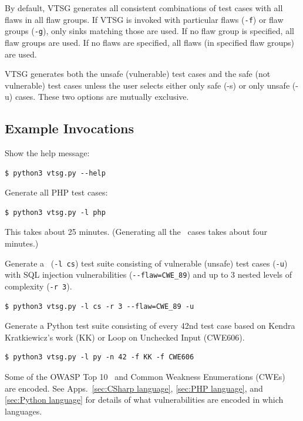 
By default, VTSG generates all consistent combinations of test cases with all flaws in
all flaw groups.  If VTSG is invoked with particular flaws (\verb|-f|) or flaw groups
(\verb|-g|), only sinks matching those are used.
If no flaw group is specified, all flaw groups are used.
If no flaws are specified, all flaws (in specified flaw groups) are used.

VTSG generates both the unsafe (vulnerable)
test cases and the safe (not vulnerable) test cases unless the user selects
either only safe (-s) or only unsafe (-u) cases.  These two options are
mutually exclusive.

\subsection{Example Invocations}

Show the help message:
\begin{verbatim}
$ python3 vtsg.py --help
\end{verbatim}

Generate all PHP test cases:
\begin{verbatim}
$ python3 vtsg.py -l php
\end{verbatim}

This takes about 25 minutes.  (Generating all the \CSharp\ cases takes about four
minutes.)

Generate a \CSharp\ (\verb|-l cs|) test suite consisting of vulnerable (unsafe) test
cases (\verb|-u|) with SQL injection vulnerabilities (\verb|--flaw=CWE_89|)
and up to 3 nested levels of complexity (\verb|-r 3|).
\begin{verbatim}
$ python3 vtsg.py -l cs -r 3 --flaw=CWE_89 -u
\end{verbatim}
 
Generate a Python test suite consisting of every 42nd test case based on Kendra
Kratkiewicz's work (KK) or Loop on Unchecked Input (CWE606).
\begin{verbatim}
$ python3 vtsg.py -l py -n 42 -f KK -f CWE606
\end{verbatim}

Some of the OWASP Top 10~\cite{OWASPTop10-2017} and
Common Weakness Enumerations (CWEs)~\cite{CWE} are encoded.
See Apps.~\ref{sec:CSharp language}, \ref{sec:PHP language}, and
\ref{sec:Python language} for details of what vulnerabilities are encoded in which
languages.

